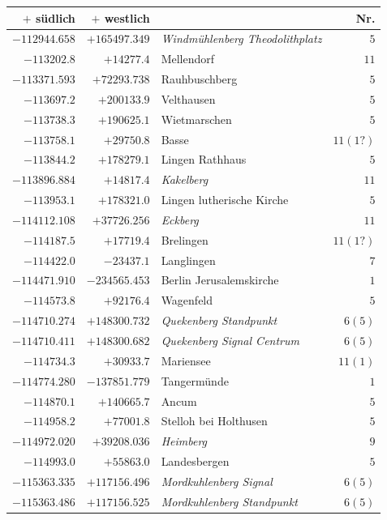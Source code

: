 \clearpage{}%
\begin{center}\begingroup\fontsize{8}{9}\selectfont
\setlength{\tabcolsep}{4pt}
\begin{tabular}{r|r|p{170pt}|r}\hline
\(+\) südlich&\(+\) westlich&&Nr.\\\hline
\(-112944.658\)&\(+165497.349\)&\textit{Windmühlenberg Theodolithplatz}&\(5\)\\
\(-113202.8\)&\(+14277.4\)&Mellendorf&\(11\)\\
\(-113371.593\)&\(+72293.738\)&Rauhbuschberg&\(5\)\\
\(-113697.2\)&\(+200133.9\)&Velthausen&\(5\)\\
\(-113738.3\)&\(+190625.1\)&Wietmarschen&\(5\)\\
\(-113758.1\)&\(+29750.8\)&Basse&\(11(1?)\)\\
\(-113844.2\)&\(+178279.1\)&Lingen Rathhaus&\(5\)\\
\(-113896.884\)&\(+14817.4\)&\textit{Kakelberg}&\(11\)\\
\(-113953.1\)&\(+178321.0\)&Lingen lutherische Kirche&\(5\)\\
\(-114112.108\)&\(+37726.256\)&\textit{Eckberg}&\(11\)\\
\(-114187.5\)&\(+17719.4\)&Brelingen&\(11(1?)\)\\
\(-114422.0\)&\(-23437.1\)&Langlingen&\(7\)\\
\(-114471.910\)&\(-234565.453\)&Berlin Jerusalemskirche&\(1\)\\
\(-114573.8\)&\(+92176.4\)&Wagenfeld&\(5\)\\
\(-114710.274\)&\(+148300.732\)&\textit{Quekenberg Standpunkt}&\(6(5)\)\\
\(-114710.411\)&\(+148300.682\)&\textit{Quekenberg Signal Centrum}&\(6(5)\)\\
\(-114734.3\)&\(+30933.7\)&Mariensee&\(11 (1)\)\\
\(-114774.280\)&\(-137851.779\)&Tangermünde&\(1\)\\
\(-114870.1\)&\(+140665.7\)&Ancum&\(5\)\\
\(-114958.2\)&\(+77001.8\)&Stelloh bei Holthusen&\(5\)\\
\(-114972.020\)&\(+39208.036\)&\textit{Heimberg}&\(9\)\\
\(-114993.0\)&\(+55863.0\)&Landesbergen&\(5\)\\
\(-115363.335\)&\(+117156.496\)&\textit{Mordkuhlenberg Signal}&\(6 (5)\)\\
\(-115363.486\)&\(+117156.525\)&\textit{Mordkuhlenberg Standpunkt}&\(6(5)\)\\

\end{tabular}
\end{center}
